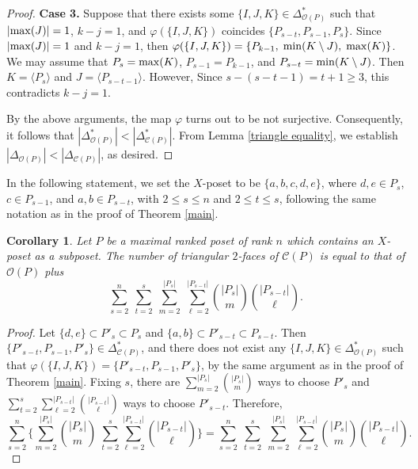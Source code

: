 \documentclass[12pt]{amsart}
\newtheorem{Corollary}[Theorem]{Corollary}
\theoremstyle{definition}
\let\phi=\varphi
\begin{document}
\begin{proof}
\medskip
\noindent
{\bf Case 3.}
Suppose that there exists some $\{I, J, K\} \in \Delta^{*}_{\mathcal{O}(P)}$ such that $|{\rm max}(J)| = 1$, $k - j = 1$, and $\phi(\{I, J, K\})$ coincides $\{P_{s - t}, P_{s - 1}, P_{s}\}$.
Since $|{\rm max}(J)| = 1$ and $k - j = 1$, then $\phi(\{I, J, K\}) = \{P_{k-1},\; {\rm min}(K \setminus J),\; {\rm max}(K)\}$.
We may assume that $P_s = {\rm max}(K)$, $P_{s-1} = P_{k-1}$, and $P_{s-t} = {\rm min}(K \setminus J)$.
Then $K = \langle P_{s} \rangle$ and $J = \langle P_{s-t-1} \rangle$.
However, Since $s - (s-t-1) = t+1 \geq 3$, this contradicts $k - j = 1$. 

\medskip
By the above arguments, the map $\phi$ turns out to be not surjective.
Consequently, it follows that $|\Delta^{*}_{\mathcal{O}(P)}| < |\Delta^{*}_{\mathcal{C}(P)}|$.
From Lemma \ref{triangle equality}, we establish $|\Delta_{\mathcal{O}(P)}| < |\Delta_{\mathcal{C}(P)}|$, as desired.
\end{proof}

In the following statement, we set the $X$-poset to be $\{a, b, c, d, e\}$, where $d, e \in P_{s}$, $ c \in P_{s - 1}$, and $a, b \in P_{s - t}$, with $2 \leq s \leq n$ and $2 \leq t \leq s$, following the same notation as in the proof of Theorem \ref{main}. 

\begin{Corollary}
Let $P$ be a maximal ranked poset of rank $n$ which contains an $X$-poset as a subposet.
The number of triangular $2$-faces of $\mathcal{C}(P)$ is equal to that of $\mathcal{O}(P)$ plus
\[\sum_{s=2}^n \; \sum_{t=2}^s \; \sum_{m=2}^{|P_s|} \;\sum_{\ell = 2}^{|P_{s-t}|} \binom{|P_s|}{m} \binom{|P_{s-t}|}{\ell}.\]
\end{Corollary}

\begin{proof}
Let $\{d, e\} \subset P'_{s} \subset P_{s}$ and $\{a, b\} \subset P'_{s-t} \subset P_{s-t}$.
Then $\{P'_{s-t}, P_{s-1}, P'_{s}\} \in \Delta^{*}_{\mathcal{C}(P)}$, and there does not exist any $\{I, J, K\} \in \Delta^{*}_{\mathcal{O}(P)}$ such that $\phi(\{I, J, K\}) = \{P'_{s - t}, P_{s - 1}, P'_{s}\}$, by the same argument as in the  proof of Theorem \ref{main}.
Fixing $s$, there are $\sum_{m =2}^{|P_s|} \binom{|P_s|}{m}$ ways to choose $P'_{s}$ and $\sum_{t=2}^{s} \sum_{\ell = 2}^{|P_{s-t}|} \binom{|P_{s-t}|}{\ell}$ ways to choose $P'_{s-t}$.
Therefore,
\[\sum_{s=2}^n\biggl\{\sum_{m =2}^{|P_s|} \binom{|P_s|}{m}\;\sum_{t=2}^{s} \sum_{\ell = 2}^{|P_{s-t}|} \binom{|P_{s-t}|}{\ell}\biggr\}
=
\sum_{s=2}^n \; \sum_{t=2}^s \; \sum_{m=2}^{|P_s|} \;\sum_{\ell = 2}^{|P_{s-t}|} \binom{|P_s|}{m} \binom{|P_{s-t}|}{\ell}.\]


\end{proof}
\end{document}
